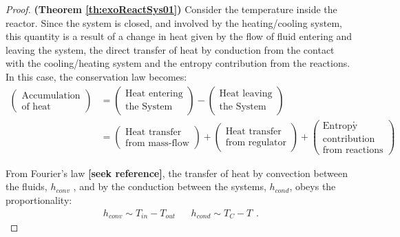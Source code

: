 \documentclass[a4paper,11pt]{book}
\numberwithin{figure}{chapter}
\numberwithin{equation}{chapter}
\numberwithin{table}{chapter}
\theoremstyle{definition}
\begin{document}
\begin{proof}{\textbf{(Theorem \ref{th:exoReactSys01})}}
    Consider the temperature inside the reactor. Since the system is closed, and involved by the heating/cooling system, this quantity is a result of a change in heat given by the flow of fluid entering and leaving the system, the direct transfer of heat by conduction from the contact with the cooling/heating system and the entropy contribution from the reactions. In this case, the conservation law becomes:  
    \begin{equation}
    \begin{split}
        \begin{pmatrix}
            \text{Accumulation} \\ \text{of heat}
        \end{pmatrix} &= \begin{pmatrix}
            \text{Heat entering} \\ \text{the System}
        \end{pmatrix} - \begin{pmatrix}
            \text{Heat leaving} \\ \text{the System}
        \end{pmatrix} \\
         &= \begin{pmatrix}
            \text{Heat transfer} \\ \text{from mass-flow}
        \end{pmatrix} + \begin{pmatrix}
            \text{Heat transfer} \\ \text{from regulator}
        \end{pmatrix} + \begin{pmatrix}
            \text{Entropy} \\ \text{contribution} \\ \text{from reactions}
        \end{pmatrix}
    \end{split}
    .\end{equation}
    
    From Fourier's law \textbf{[seek reference]}, the transfer of heat by convection between the fluids, $h_{conv}$ , and by the conduction between the systems, $h_{cond}$, obeys the proportionality:
    \begin{equation}
        \begin{matrix}
            h_{conv} \sim T_{in} - T_{out} & & h_{cond} \sim T_C - T
        \end{matrix}
    .\end{equation}      
    

\end{proof}
\end{document}
